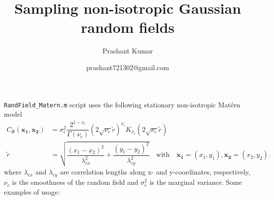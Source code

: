 \documentclass{extarticle}
\title{Sampling non-isotropic Gaussian random fields}
\author{Prashant Kumar}
\date{prashant721302@gmail.com}
\begin{document}
\maketitle
\texttt{RandField\_Matern.m} script  uses the following stationary non-isotropic Mat\'ern model 
\begin{align}
C_\Phi(\mathbf{x_1},\mathbf{x_2}) &= \sigma_c^2\dfrac{2^{1-\nu_c}}{\Gamma(\nu_c)}\left( 2\sqrt{\nu_c}\tilde{r}\right)^{\nu_c} K_{\nu_c}\left( 2\sqrt{\nu_c}\tilde{r}\right)\\
\tilde{r}  &= \sqrt{\dfrac{(x_1-x_2)^2}{\lambda^2_{cx}}+ \dfrac{(y_1-y_2)^2}{\lambda^2_{cy}}}\quad\text{with}\quad \mathbf{x_1} = (x_1,y_1),\mathbf{x_2} = (x_2,y_2).
\end{align}
where $\lambda_{cx}$ and $\lambda_{cy}$ are correlation lengths along x- and y-coordinates, respectively, $\nu_c$ is the smoothness of the random field and $\sigma^2_c$ is the marginal variance. Some examples of usage:
\end{document}
